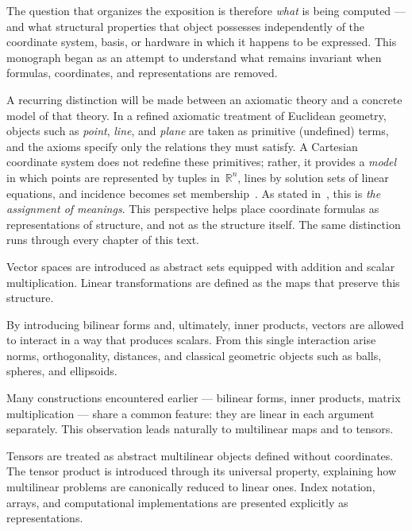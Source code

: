\documentclass[12pt,openany]{book}
\theoremstyle{definition}
\begin{document}
\medskip

The question that organizes the exposition is therefore \emph{what} is being computed --- and what
structural properties that object possesses independently of the coordinate
system, basis, or hardware in which it happens to be expressed.
This monograph began as an attempt to understand what remains invariant when
formulas, coordinates, and representations are removed.

\medskip

A recurring distinction will be made between an axiomatic theory and a
concrete model of that theory.
In a refined axiomatic treatment of Euclidean geometry, objects such as
\textit{point}, \textit{line}, and \textit{plane} are taken as primitive
(undefined) terms, and the axioms specify only the relations they must satisfy.
A Cartesian coordinate system does not redefine these primitives; rather, it
provides a \emph{model} in which points are represented by tuples
in~$\mathbb{R}^n$, lines by solution sets of linear equations, and incidence
becomes set membership~\cite{iribarren2}.
As stated in~\cite{wilder}, this is \textit{the assignment of meanings}.
This perspective helps place coordinate formulas as representations of
structure, and not as the structure itself.
The same distinction runs through every chapter of this text.

\medskip

Vector spaces are introduced as abstract sets equipped with addition and scalar
multiplication.
Linear transformations are defined as the maps that preserve this structure.

\medskip

By introducing bilinear forms and, ultimately, inner products, vectors are
allowed to interact in a way that produces scalars.
From this single interaction arise norms, orthogonality, distances, and
classical geometric objects such as balls, spheres, and ellipsoids.

\medskip

Many constructions encountered earlier --- bilinear forms, inner products,
matrix multiplication --- share a common feature: they are linear in each
argument separately.
This observation leads naturally to multilinear maps and to tensors.

\medskip

Tensors are treated as abstract multilinear objects defined without
coordinates.
The tensor product is introduced through its universal property, explaining
how multilinear problems are canonically reduced to linear ones.
Index notation, arrays, and computational implementations are presented
explicitly as representations.
\end{document}
